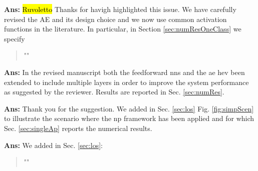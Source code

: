 \documentclass[draftcls,onecolumn,12pt]{IEEEtran}
\newcounter{revc}
\newcommand{\revp}[1]{\zref[revcontent]{#1}}
\begin{document}
\vspace{5mm} %
\begin{framed}
\end{framed}


{\bf Ans:} 
\hl{Ruvoletto}
Thanks for havigh highlighted this issue. We have carefully revised the AE and its design choice and we now use common activation functions in the literature. In particular, in Section \ref{sec:numResOneClass} we specify
\begin{quote}
"\revp{designAE}"
\end{quote}

\vspace{5mm} %
\begin{framed}
\end{framed}

{\bf Ans:} In the revised manuscript both the feedforward \acp{nn} and the \ac{ae} hev been extended to include multiple layers in order to improve the system performance as suggested by the reviewer. Results are reported in Sec. \ref{sec:numRes}.

\vspace{5mm} %
\begin{framed}
\end{framed}

{\bf Ans:} Thank you for the suggestion. We added in Sec. \ref{sec:los} Fig. \ref{fig:simpScen} to illustrate the scenario where the \ac{np} framework has been applied and for which Sec. \ref{sec:singleAp} reports the numerical results.

\vspace{5mm} %
\begin{framed}
\end{framed}

{\bf Ans:} We added in Sec. \ref{sec:los}:
\begin{quote}
"\revp{llrComp}"
\end{quote}
\end{document}

